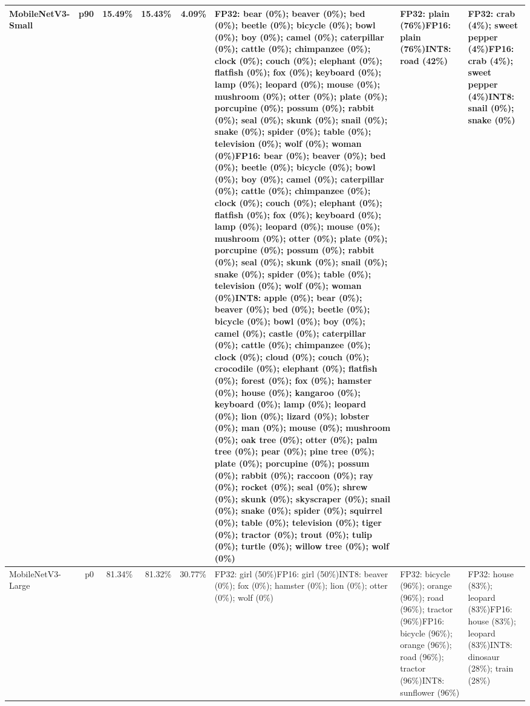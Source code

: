 \begin{longtable}{p{2.8cm} r r r r p{5.0cm} p{4.2cm} p{4.2cm}}
MobileNetV3-Small & p90 & 15.49\% & 15.43\% & 4.09\% & FP32: bear (0\%); beaver (0\%); bed (0\%); beetle (0\%); bicycle (0\%); bowl (0\%); boy (0\%); camel (0\%); caterpillar (0\%); cattle (0\%); chimpanzee (0\%); clock (0\%); couch (0\%); elephant (0\%); flatfish (0\%); fox (0\%); keyboard (0\%); lamp (0\%); leopard (0\%); mouse (0\%); mushroom (0\%); otter (0\%); plate (0\%); porcupine (0\%); possum (0\%); rabbit (0\%); seal (0\%); skunk (0\%); snail (0\%); snake (0\%); spider (0\%); table (0\%); television (0\%); wolf (0\%); woman (0\%)\newline FP16: bear (0\%); beaver (0\%); bed (0\%); beetle (0\%); bicycle (0\%); bowl (0\%); boy (0\%); camel (0\%); caterpillar (0\%); cattle (0\%); chimpanzee (0\%); clock (0\%); couch (0\%); elephant (0\%); flatfish (0\%); fox (0\%); keyboard (0\%); lamp (0\%); leopard (0\%); mouse (0\%); mushroom (0\%); otter (0\%); plate (0\%); porcupine (0\%); possum (0\%); rabbit (0\%); seal (0\%); skunk (0\%); snail (0\%); snake (0\%); spider (0\%); table (0\%); television (0\%); wolf (0\%); woman (0\%)\newline INT8: apple (0\%); bear (0\%); beaver (0\%); bed (0\%); beetle (0\%); bicycle (0\%); bowl (0\%); boy (0\%); camel (0\%); castle (0\%); caterpillar (0\%); cattle (0\%); chimpanzee (0\%); clock (0\%); cloud (0\%); couch (0\%); crocodile (0\%); elephant (0\%); flatfish (0\%); forest (0\%); fox (0\%); hamster (0\%); house (0\%); kangaroo (0\%); keyboard (0\%); lamp (0\%); leopard (0\%); lion (0\%); lizard (0\%); lobster (0\%); man (0\%); mouse (0\%); mushroom (0\%); oak tree (0\%); otter (0\%); palm tree (0\%); pear (0\%); pine tree (0\%); plate (0\%); porcupine (0\%); possum (0\%); rabbit (0\%); raccoon (0\%); ray (0\%); rocket (0\%); seal (0\%); shrew (0\%); skunk (0\%); skyscraper (0\%); snail (0\%); snake (0\%); spider (0\%); squirrel (0\%); table (0\%); television (0\%); tiger (0\%); tractor (0\%); trout (0\%); tulip (0\%); turtle (0\%); willow tree (0\%); wolf (0\%) & FP32: plain (76\%)\newline FP16: plain (76\%)\newline INT8: road (42\%) & FP32: crab (4\%); sweet pepper (4\%)\newline FP16: crab (4\%); sweet pepper (4\%)\newline INT8: snail (0\%); snake (0\%) \\ \hline
MobileNetV3-Large & p0 & 81.34\% & 81.32\% & 30.77\% & FP32: girl (50\%)\newline FP16: girl (50\%)\newline INT8: beaver (0\%); fox (0\%); hamster (0\%); lion (0\%); otter (0\%); wolf (0\%) & FP32: bicycle (96\%); orange (96\%); road (96\%); tractor (96\%)\newline FP16: bicycle (96\%); orange (96\%); road (96\%); tractor (96\%)\newline INT8: sunflower (96\%) & FP32: house (83\%); leopard (83\%)\newline FP16: house (83\%); leopard (83\%)\newline INT8: dinosaur (28\%); train (28\%) \\ \hline

\end{longtable}
